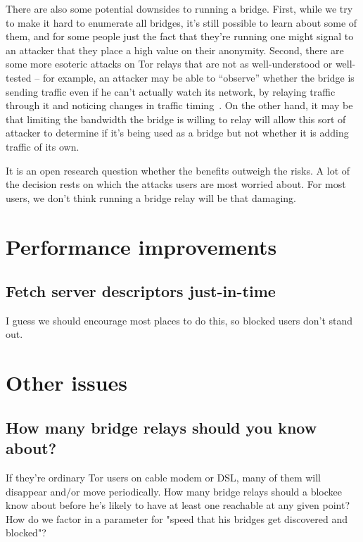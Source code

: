 \documentclass{llncs}
\begin{document}
There are also some potential downsides to running a bridge. First, while
we try to make it hard to enumerate all bridges, it's still possible to
learn about some of them, and for some people just the fact that they're
running one might signal to an attacker that they place a high value
on their anonymity. Second, there are some more esoteric attacks on Tor
relays that are not as well-understood or well-tested -- for example, an
attacker may be able to ``observe'' whether the bridge is sending traffic
even if he can't actually watch its network, by relaying traffic through
it and noticing changes in traffic timing~\cite{attack-tor-oak05}. On
the other hand, it may be that limiting the bandwidth the bridge is
willing to relay will allow this sort of attacker to determine if it's
being used as a bridge but not whether it is adding traffic of its own.

It is an open research question whether the benefits outweigh the risks. A
lot of the decision rests on which the attacks users are most worried
about. For most users, we don't think running a bridge relay will be
that damaging.

\section{Performance improvements}

\subsection{Fetch server descriptors just-in-time}

I guess we should encourage most places to do this, so blocked
users don't stand out.

\section{Other issues}

\subsection{How many bridge relays should you know about?}

If they're ordinary Tor users on cable modem or DSL, many of them will
disappear and/or move periodically. How many bridge relays should a
blockee know
about before he's likely to have at least one reachable at any given point?
How do we factor in a parameter for "speed that his bridges get discovered
and blocked"?
\end{document}
